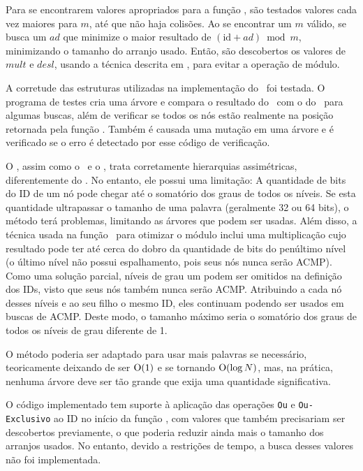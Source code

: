 Para se encontrarem valores apropriados para a função \Espalha, são testados valores cada vez maiores para $m$, até que não haja colisões.
Ao se encontrar um $m$ válido, se busca um $\mathit{ad}$ que minimize o maior resultado de $(\mathrm{id} + \mathit{ad}) \bmod m$, minimizando o tamanho do arranjo usado.
Então, são descobertos os valores de $\mathit{mult}$ e $\mathit{desl}$, usando a técnica descrita em , para evitar a operação de módulo.

A corretude das estruturas utilizadas na implementação do \Novo\ foi testada.
O programa de testes cria uma árvore e compara o resultado do \Simples\ com o do \Novo\ para algumas buscas, além de verificar se todos os nós estão realmente na posição retornada pela função \Espalha.
Também é causada uma mutação em uma árvore e é verificado se o erro é detectado por esse código de verificação.


O \Novo, assim como o \Hwloc\ e o \Matriz, trata corretamente hierarquias assimétricas, diferentemente do \Simples.
No entanto, ele possui uma limitação: %
A quantidade de bits do ID de um nó pode chegar até o somatório dos graus de todos os níveis.
Se esta quantidade ultrapassar o tamanho de uma palavra (geralmente 32 ou 64 bits), o método terá problemas, limitando as árvores que podem ser usadas.
Além disso, a técnica usada na função \Espalha\ para otimizar o módulo inclui uma multiplicação cujo resultado pode ter até cerca do dobro da quantidade de bits do penúltimo nível (o último nível não possui espalhamento, pois seus nós nunca serão ACMP).
Como uma solução parcial, níveis de grau um podem ser omitidos na definição dos IDs, visto que seus nós também nunca serão ACMP.
Atribuindo a cada nó desses níveis e ao seu filho o mesmo ID, eles continuam podendo ser usados em buscas de ACMP.
Deste modo, o tamanho máximo seria o somatório dos graus de todos os níveis de grau diferente de 1.

O método poderia ser adaptado para usar mais palavras se necessário, teoricamente deixando de ser $\operatorname{O}(1)$ e se tornando $\operatorname{O}(\log N)$, mas, na prática, nenhuma árvore deve ser tão grande que exija uma quantidade significativa.

O código implementado tem suporte à aplicação das operações \texttt{Ou} e \texttt{Ou-Exclusivo} ao ID no início da função \Espalha, com valores que também precisariam ser descobertos previamente, o que poderia reduzir ainda mais o tamanho dos arranjos usados. No entanto, devido a restrições de tempo, a busca desses valores não foi implementada.
